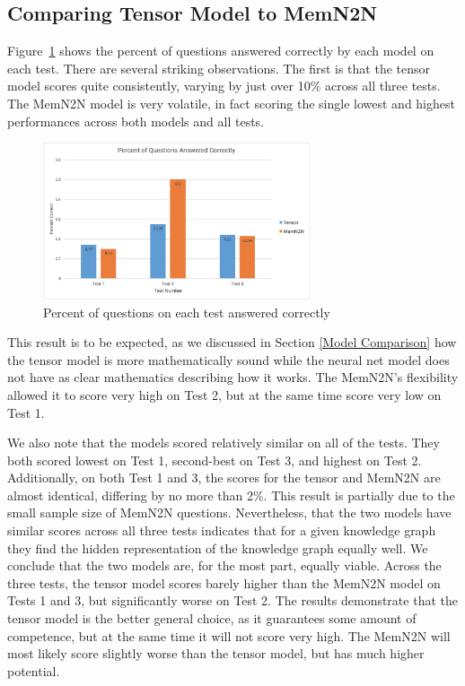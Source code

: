 \documentclass[pageno]{final_paper}
\begin{document}
\subsection{Comparing Tensor Model to MemN2N}
\label{Comparing Tensor Model to MemN2N}

Figure~\ref{fig: qa_by_test} shows the percent of questions answered correctly
by each model on each test. There are several striking observations. The first
is that the tensor model scores quite consistently, varying by just over 10\%
across all three tests. The MemN2N model is very volatile, in fact scoring the
single lowest and highest performances across both models and all tests.

\begin{figure}[!tb]
    \centering
    \includegraphics[width=0.7\textwidth,keepaspectratio]{figures/qa_by_test.png}
    \caption{Percent of questions on each test answered correctly}
    \label{fig: qa_by_test}
\end{figure}

This result is to be expected, as we discussed in Section \ref{Model Comparison}
how the tensor model is more mathematically sound while the neural net model
does not have as clear mathematics describing how it works. The MemN2N's
flexibility allowed it to score very high on Test 2, but at the same time score
very low on Test 1.

We also note that the models scored relatively similar on all of the tests. They
both scored lowest on Test 1, second-best on Test 3, and highest on Test 2.
Additionally, on both Test 1 and 3, the scores for the tensor and MemN2N are
almost identical, differing by no more than 2\%. This result is partially due to
the small sample size of MemN2N questions. Nevertheless, that the two models
have similar scores across all three tests indicates that for a given knowledge
graph they find the hidden representation of the knowledge graph equally well.
We conclude that the two models are, for the most part, equally viable. Across
the three tests, the tensor model scores barely higher than the MemN2N model on
Tests 1 and 3, but significantly worse on Test 2. The results demonstrate that
the tensor model is the better general choice, as it guarantees some amount of
competence, but at the same time it will not score very high. The MemN2N will
most likely score slightly worse than the tensor model, but has much higher
potential.
\end{document}
